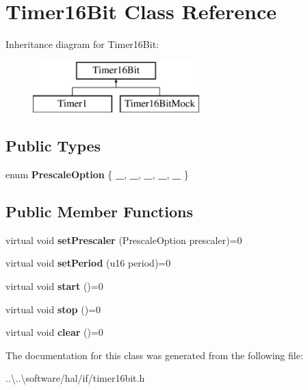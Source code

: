 \hypertarget{class_timer16_bit}{}\section{Timer16\+Bit Class Reference}
\label{class_timer16_bit}
Inheritance diagram for Timer16\+Bit\+:\begin{figure}[H]
\begin{center}
\leavevmode
\includegraphics[height=2.000000cm]{class_timer16_bit}
\end{center}
\end{figure}
\subsection*{Public Types}
\begin{DoxyCompactItemize}
\item 
\mbox{\label{class_timer16_bit_ae77570668c50b86c26be7d095490ddb4}} 
enum {\bfseries Prescale\+Option} \{ \newline
{\bfseries \+\_}, 
{\bfseries \+\_}, 
{\bfseries \+\_}, 
{\bfseries \+\_}, 
\newline
{\bfseries \+\_}
 \}
\end{DoxyCompactItemize}
\subsection*{Public Member Functions}
\begin{DoxyCompactItemize}
\item 
\mbox{\label{class_timer16_bit_aee78b64b4e1ebd3a0ac5e671f13715c6}} 
virtual void {\bfseries set\+Prescaler} (Prescale\+Option prescaler)=0
\item 
\mbox{\label{class_timer16_bit_a7e1d467fc113a127dd77e2df135e872f}} 
virtual void {\bfseries set\+Period} (u16 period)=0
\item 
\mbox{\label{class_timer16_bit_a7b26f468974c9da8d96c43f920bda96e}} 
virtual void {\bfseries start} ()=0
\item 
\mbox{\label{class_timer16_bit_abc261659bd9a3b0499e56352dbc37bc3}} 
virtual void {\bfseries stop} ()=0
\item 
\mbox{\label{class_timer16_bit_a24ab7f6d22dd9af3ad60c7b3472a62a0}} 
virtual void {\bfseries clear} ()=0
\end{DoxyCompactItemize}


The documentation for this class was generated from the following file\+:\begin{DoxyCompactItemize}
\item 
..\textbackslash{}..\textbackslash{}software/hal/if/timer16bit.\+h\end{DoxyCompactItemize}
